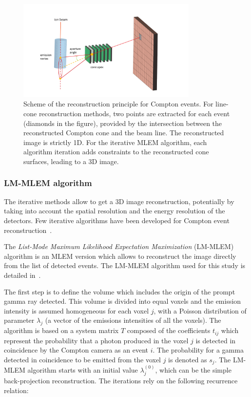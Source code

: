 \begin{figure}
\centering
  \includegraphics[width=0.8\textwidth]{./Figure/reconstruction_scheme}
  \caption{Scheme of the reconstruction principle for Compton events. For line-cone reconstruction methods, two points are extracted for each event (diamonds in the figure), provided by the intersection between the reconstructed Compton cone and the beam line. The reconstructed image is strictly 1D. For the iterative MLEM algorithm, each algorithm iteration adds constraints to the reconstructed cone surfaces, leading to  a 3D image.}	
  \label{fig:reconstruction_scheme}
\end{figure}

\subsubsection{LM-MLEM algorithm}	
The iterative methods allow to get a 3D image reconstruction, potentially by taking into account the spatial resolution and the energy resolution of the detectors. Few iterative algorithms have been developed for Compton event reconstruction~\cite{schone_common_2010, zoglauer_design_2011,gillam_compton_2011,mackin_evaluation_2012,lojacono_low_2013}.

The \textit{List-Mode Maximum Likelihood Expectation Maximization} (LM-MLEM) algorithm is an MLEM version which allows to reconstruct the image directly from the list of detected events.
The LM-MLEM algorithm used for this study is detailed in~\cite{maxim_filtered_2014,hilaire_compton_2014}.%

The first step is to define the volume which includes the origin of the prompt gamma ray detected. This volume is divided into equal voxels and the emission intensity is assumed homogeneous for each voxel $j$, with a Poisson distribution of parameter $\lambda_j$ (a vector of the emissions intensities of all the voxels). The algorithm is based on a system matrix $T$ composed of the coefficients  $t_{ij}$ which represent the probability that a photon produced in the voxel $j$ is detected in coincidence by the Compton camera as an event $i$. The probability for a gamma detected in coincidence to be emitted from the voxel $j$ is denoted as $s_j$.
The LM-MLEM algorithm starts with an initial value $\lambda^{(0)}_j$, which can be the simple back-projection reconstruction.
The iterations rely on the following recurrence relation:

